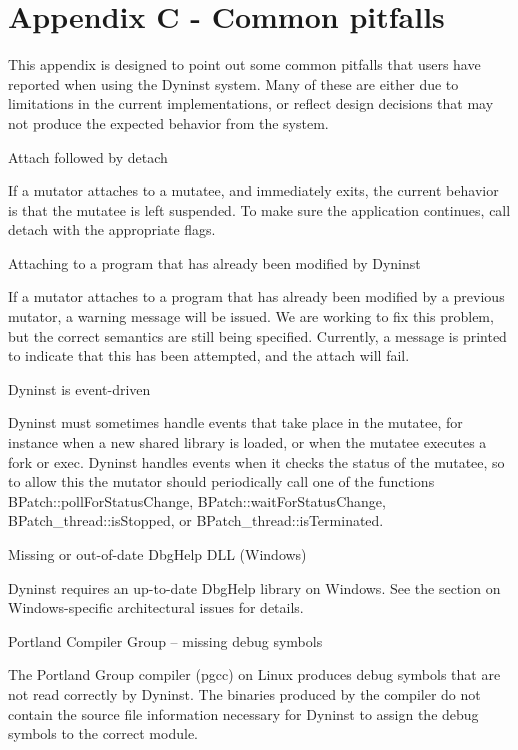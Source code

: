 \section[Appendix C {}- Common pitfalls]{Appendix C - Common pitfalls}
{
This appendix is designed to point out some common pitfalls that users have reported when using the Dyninst system.
Many of these are either due to limitations in the current implementations, or reflect design decisions that may not
produce the expected behavior from the system.}

{
Attach followed by detach}

{
If a mutator attaches to a mutatee, and immediately exits, the current behavior is that the mutatee is left suspended.
To make sure the application continues, call detach with the appropriate flags.}

{
Attaching to a program that has already been modified by Dyninst}

{
If a mutator attaches to a program that has already been modified by a previous mutator, a warning message will be
issued. We are working to fix this problem, but the correct semantics are still being specified. Currently, a message
is printed to indicate that this has been attempted, and the attach will fail.}

{
Dyninst is event-driven}

{
Dyninst must sometimes handle events that take place in the mutatee, for instance when a new shared library is loaded,
or when the mutatee executes a fork or exec. Dyninst handles events when it checks the status of the mutatee, so to
allow this the mutator should periodically call one of the functions BPatch::pollForStatusChange,
BPatch::wait­ForStatusChange, BPatch_thread::isStopped, or BPatch_­thread::is­Termin­ated.}

{
Missing or out-of-date DbgHelp DLL (Windows)}

{
Dyninst requires an up-to-date DbgHelp library on Windows. See the section on Windows-specific architectural
issues for details.}

{
Portland Compiler Group – missing debug symbols}

{
The Portland Group compiler (pgcc) on Linux produces debug symbols that are not read correctly by Dyninst. The
binaries produced by the compiler do not contain the source file information necessary for Dyninst to assign the debug
symbols to the correct module.}
